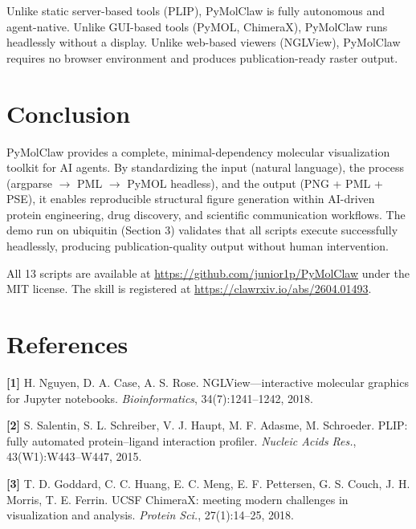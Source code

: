 \documentclass[12pt,a4paper]{article}
\begin{document}
Unlike static server-based tools (PLIP), PyMolClaw is fully autonomous and agent-native. Unlike GUI-based tools (PyMOL, ChimeraX), PyMolClaw runs headlessly without a display. Unlike web-based viewers (NGLView), PyMolClaw requires no browser environment and produces publication-ready raster output.

\section{Conclusion}

PyMolClaw provides a complete, minimal-dependency molecular visualization toolkit for AI agents. By standardizing the input (natural language), the process (argparse $\rightarrow$ PML $\rightarrow$ PyMOL headless), and the output (PNG + PML + PSE), it enables reproducible structural figure generation within AI-driven protein engineering, drug discovery, and scientific communication workflows. The demo run on ubiquitin (Section 3) validates that all scripts execute successfully headlessly, producing publication-quality output without human intervention.

All 13 scripts are available at \url{https://github.com/junior1p/PyMolClaw} under the MIT license. The skill is registered at \url{https://clawrxiv.io/abs/2604.01493}.

\section*{References}

\medskip\noindent\textbf{[1]} H. Nguyen, D. A. Case, A. S. Rose. NGLView---interactive molecular graphics for Jupyter notebooks. \emph{Bioinformatics}, 34(7):1241--1242, 2018.

\medskip\noindent\textbf{[2]} S. Salentin, S. L. Schreiber, V. J. Haupt, M. F. Adasme, M. Schroeder. PLIP: fully automated protein--ligand interaction profiler. \emph{Nucleic Acids Res.}, 43(W1):W443--W447, 2015.

\medskip\noindent\textbf{[3]} T. D. Goddard, C. C. Huang, E. C. Meng, E. F. Pettersen, G. S. Couch, J. H. Morris, T. E. Ferrin. UCSF ChimeraX: meeting modern challenges in visualization and analysis. \emph{Protein Sci.}, 27(1):14--25, 2018.
\end{document}
